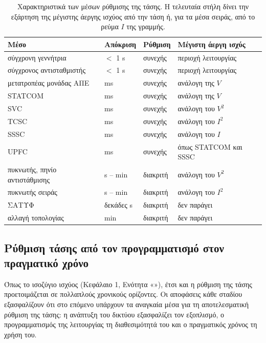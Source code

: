 \begin{table}[!htbp]
\centering
\begin{tabular}{llll}
\hline
Μέσο & Απόκριση & Ρύθμιση & Μέγιστη άεργη ισχύς \\
\hline
σύγχρονη γεννήτρια & $<$ 1 s & συνεχής & περιοχή λειτουργίας \\
σύγχρονος αντισταθμιστής & $<$ 1 s & συνεχής & περιοχή λειτουργίας \\
μετατροπέας μονάδας ΑΠΕ & ms & συνεχής & ανάλογη της $V$ \\
STATCOM & ms & συνεχής & ανάλογη της $V$ \\
SVC & ms & συνεχής & ανάλογη του $V^2$ \\
TCSC & ms & συνεχής & ανάλογη του $I^2$ \\
SSSC & ms & συνεχής & ανάλογη του $I$ \\
UPFC & ms & συνεχής & όπως STATCOM και SSSC \\
πυκνωτής, πηνίο αντιστάθμισης & s -- min & διακριτή & ανάλογη του $V^2$ \\
πυκνωτής σειράς & s -- min & διακριτή & ανάλογη του $I^2$ \\
ΣΑΤΥΦ & δεκάδες s & διακριτή & δεν παράγει \\
αλλαγή τοπολογίας & min & διακριτή & δεν παράγει \\
\hline
\end{tabular}
\caption{Χαρακτηριστικά των μέσων ρύθμισης της τάσης. Η τελευταία στήλη δίνει την εξάρτηση της
μέγιστης άεργης ισχύος από την τάση ή, για τα μέσα σειράς, από το ρεύμα $I$ της γραμμής.}
\label{tab:v-means}
\end{table}

\subsection{Ρύθμιση τάσης από τον προγραμματισμό στον πραγματικό χρόνο}
\label{sec:v-stages}

Όπως το ισοζύγιο ισχύος (Κεφάλαιο 1, Ενότητα «»), έτσι και η ρύθμιση της
τάσης προετοιμάζεται σε πολλαπλούς χρονικούς ορίζοντες. Οι αποφάσεις κάθε σταδίου εξασφαλίζουν
ότι στο επόμενο υπάρχουν τα αναγκαία μέσα για τη αποτελεσματική ρύθμιση της τάσης: η ανάπτυξη του δικτύου εξασφαλίζει τον εξοπλισμό, ο
προγραμματισμός της λειτουργίας τη διαθεσιμότητά του και ο πραγματικός χρόνος τη χρήση του.

